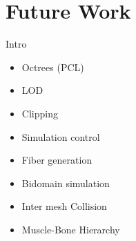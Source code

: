 
\section{Future Work}
Intro

\begin{itemize}
\item 
Octrees (PCL)
\item
LOD
\item
Clipping
\item
Simulation control
\item
Fiber generation
\item
Bidomain simulation
\item
Inter mesh Collision
\item
Muscle-Bone Hierarchy
\end{itemize}